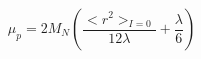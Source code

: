 \begin{equation}
\mu_p = 2 M_N (\frac{<r^2>_{I=0} }{12 \lambda} + \frac{\lambda}{6})
\end{equation}

